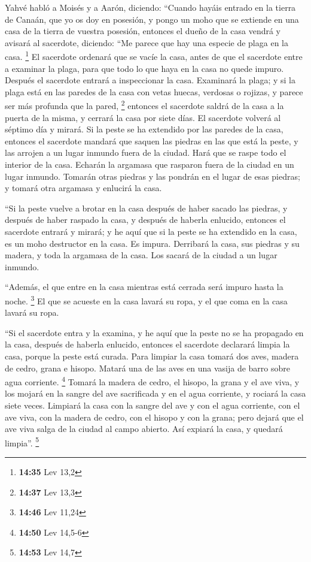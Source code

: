 \begin{paracol}{2}
 Yahvé habló a Moisés y a Aarón, diciendo:
 ``Cuando hayáis entrado en la tierra de Canaán, que yo
os doy en posesión, y pongo un moho que se extiende en una casa de la
tierra de vuestra posesión,  entonces el dueño de la casa
vendrá y avisará al sacerdote, diciendo: ``Me parece que hay una especie
de plaga en la casa. \footnote{\textbf{14:35} Lev 13,2} 
El sacerdote ordenará que se vacíe la casa, antes de que el sacerdote
entre a examinar la plaga, para que todo lo que haya en la casa no quede
impuro. Después el sacerdote entrará a inspeccionar la casa.
 Examinará la plaga; y si la plaga está en las paredes de
la casa con vetas huecas, verdosas o rojizas, y parece ser más profunda
que la pared, \footnote{\textbf{14:37} Lev 13,3} 
entonces el sacerdote saldrá de la casa a la puerta de la misma, y
cerrará la casa por siete días.  El sacerdote volverá al
séptimo día y mirará. Si la peste se ha extendido por las paredes de la
casa,  entonces el sacerdote mandará que saquen las
piedras en las que está la peste, y las arrojen a un lugar inmundo fuera
de la ciudad.  Hará que se raspe todo el interior de la
casa. Echarán la argamasa que rasparon fuera de la ciudad en un lugar
inmundo.  Tomarán otras piedras y las pondrán en el lugar
de esas piedras; y tomará otra argamasa y enlucirá la casa.

 ``Si la peste vuelve a brotar en la casa después de
haber sacado las piedras, y después de haber raspado la casa, y después
de haberla enlucido,  entonces el sacerdote entrará y
mirará; y he aquí que si la peste se ha extendido en la casa, es un moho
destructor en la casa. Es impura.  Derribará la casa, sus
piedras y su madera, y toda la argamasa de la casa. Los sacará de la
ciudad a un lugar inmundo.

 ``Además, el que entre en la casa mientras está cerrada
será impuro hasta la noche. \footnote{\textbf{14:46} Lev 11,24}
 El que se acueste en la casa lavará su ropa, y el que
coma en la casa lavará su ropa.

 ``Si el sacerdote entra y la examina, y he aquí que la
peste no se ha propagado en la casa, después de haberla enlucido,
entonces el sacerdote declarará limpia la casa, porque la peste está
curada.  Para limpiar la casa tomará dos aves, madera de
cedro, grana e hisopo.  Matará una de las aves en una
vasija de barro sobre agua corriente. \footnote{\textbf{14:50} Lev
  14,5-6}  Tomará la madera de cedro, el hisopo, la grana
y el ave viva, y los mojará en la sangre del ave sacrificada y en el
agua corriente, y rociará la casa siete veces.  Limpiará
la casa con la sangre del ave y con el agua corriente, con el ave viva,
con la madera de cedro, con el hisopo y con la grana; 
pero dejará que el ave viva salga de la ciudad al campo abierto. Así
expiará la casa, y quedará limpia''. \footnote{\textbf{14:53} Lev 14,7}


\end{paracol}

